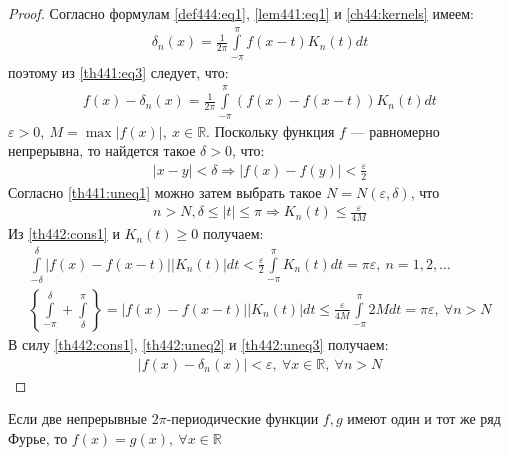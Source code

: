 \begin{proof}
  Согласно формулам \eqref{def444:eq1}, \eqref{lem441:eq1} и
  \eqref{ch44:kernels} имеем: \\
  \begin{gather}
    \delta_n(x) = \frac{1}{2\pi} \int\limits_{-\pi}^\pi f(x - t) K_n(t) dt
  \end{gather}
  поэтому из \eqref{th441:eq3} следует, что:
  \begin{gather}
    f(x) - \delta_n(x) = \frac{1}{2\pi} \int\limits_{-\pi}^\pi (f(x) - f(x -
    t)) K_n(t) dt
    \label{th442:eq1}
  \end{gather}
  $\varepsilon > 0, \ M = \max |f(x)|, \ x \in \mathbb{R}$. Поскольку функция
  $f$ --- равномерно непрерывна, то найдется такое $\delta > 0$, что:
  \begin{gather}
    |x - y| < \delta \Rightarrow |f(x) - f(y)| < \frac{\varepsilon}{2}
    \label{th442:cons1}
  \end{gather}
  Согласно \eqref{th441:uneq1} можно затем выбрать такое $N = N(\varepsilon,
  \delta)$, что
  \begin{gather}
    n > N, \delta \leq |t| \leq \pi \Rightarrow K_n(t) \leq
    \frac{\varepsilon}{4M}
    \label{th442:uneq1}
  \end{gather}
  Из \eqref{th442:cons1} и $K_n(t) \geq 0$ получаем:
  \begin{gather}
    \int\limits_{-\delta}^\delta |f(x) - f(x - t)| |K_n(t)| dt <
    \frac{\varepsilon}{2} \int\limits_{-\pi}^\pi K_n(t) dt = \pi \varepsilon, \
    n = 1, 2, \dots
    \label{th442:uneq2} \\
    \left\{\int\limits_{-\pi}^\delta + \int\limits_{\delta}^\pi \right\} =
    |f(x) - f(x-t)| |K_n(t)| dt \leq \frac{\varepsilon}{4M}
    \int\limits_{-\pi}^\pi 2M dt = \pi \varepsilon, \ \forall n > N
    \label{th442:uneq3}
  \end{gather}
  В силу \eqref{th442:cons1}, \eqref{th442:uneq2} и \eqref{th442:uneq3}
  получаем:
  \begin{gather}
    |f(x) - \delta_n(x)| < \varepsilon, \ \forall x \in \mathbb{R}, \ \forall n
    > N
    \label{th442:uneq4}
  \end{gather}
\end{proof}

\begin{consequence}
  Если две непрерывные $2\pi$-периодические функции $f, g$ имеют один и тот же
  ряд Фурье, то $f(x) = g(x), \ \forall x \in \mathbb{R}$
\end{consequence}


